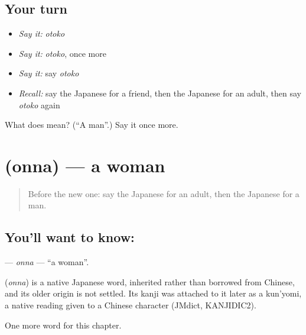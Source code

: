\subsection*{Your turn}
\begin{itemize}
\raggedright
  \item \emph{Say it:} \emph{otoko}
  \item \emph{Say it:} \emph{otoko}, once more
  \item \emph{Say it:} say \emph{otoko}
  \item \emph{Recall:} say the Japanese for a friend, then the Japanese for an adult, then say \emph{otoko} again
\end{itemize}

\begin{tcolorbox}[breakable,colback=teal!4,colframe=teal!35!black,title={Before you move on}]
What does  mean? (\textquotedblleft{}A man\textquotedblright{}.) Say it once more.
\end{tcolorbox}
\section[\texorpdfstring{\ja{おんな} (onna)}{おんな (onna)}]{ (onna) — a woman}

\label{lesson:JA-C25-onna}



\begin{quote}
Before the new one: say the Japanese for an adult, then the Japanese for a man.
\end{quote}

\subsection*{You'll want to know: }
\textbf{} — \emph{onna} — \textquotedblleft{}a woman\textquotedblright{}.

\begin{cousinweb}
\textbf{} (\emph{onna}) is a native Japanese word, inherited rather than borrowed from Chinese, and its older origin is not settled. Its kanji was attached to it later as a kun'yomi, a native reading given to a Chinese character (JMdict, KANJIDIC2).
\end{cousinweb}

\begin{grammarlens}[title={What you've built}]
One more word for this chapter.
\end{grammarlens}

